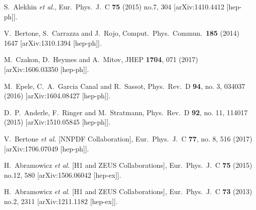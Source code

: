 \documentclass[letter,11pt]{article}
\begin{document}
\begin{thebibliography}{99}
 S.~Alekhin {\it et al.},
 Eur.\ Phys.\ J.\ C {\bf 75} (2015) no.7,  304
 [arXiv:1410.4412 [hep-ph]].

 V.~Bertone, S.~Carrazza and J.~Rojo,
 Comput.\ Phys.\ Commun.\  {\bf 185} (2014) 1647
 [arXiv:1310.1394 [hep-ph]].

  M.~Czakon, D.~Heymes and A.~Mitov,
  JHEP {\bf 1704}, 071 (2017)
  [arXiv:1606.03350 [hep-ph]].

  M.~Epele, C.~A.~Garcia Canal and R.~Sassot,
  Phys.\ Rev.\ D {\bf 94}, no. 3, 034037 (2016)
  [arXiv:1604.08427 [hep-ph]].

  D.~P.~Anderle, F.~Ringer and M.~Stratmann,
  Phys.\ Rev.\ D {\bf 92}, no. 11, 114017 (2015)
  [arXiv:1510.05845 [hep-ph]].

  V.~Bertone {\it et al.} [NNPDF Collaboration],
  Eur.\ Phys.\ J.\ C {\bf 77}, no. 8, 516 (2017)
  [arXiv:1706.07049 [hep-ph]].

 H.~Abramowicz {\it et al.} [H1 and ZEUS Collaborations],
 Eur.\ Phys.\ J.\ C {\bf 75} (2015) no.12,  580
 [arXiv:1506.06042 [hep-ex]].

 H.~Abramowicz {\it et al.} [H1 and ZEUS Collaborations],
 Eur.\ Phys.\ J.\ C {\bf 73} (2013) no.2,  2311
 [arXiv:1211.1182 [hep-ex]].


\end{thebibliography}
\end{document}
